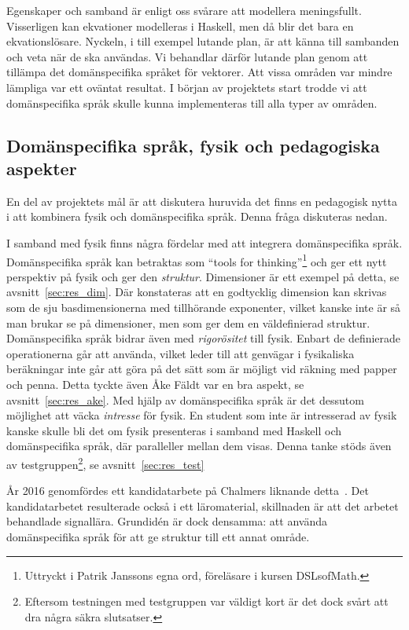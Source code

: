Egenskaper och samband är enligt oss svårare att modellera meningsfullt. Visserligen kan ekvationer modelleras i Haskell, men då blir det bara en ekvationslösare. Nyckeln, i till exempel lutande plan, är att känna till sambanden och veta när de ska användas. Vi behandlar därför lutande plan genom att tillämpa det domänspecifika språket för vektorer. Att vissa områden var mindre lämpliga var ett oväntat resultat. I början av projektets start trodde vi att domänspecifika språk skulle kunna implementeras till alla typer av områden.

\subsection{Domänspecifika språk, fysik och pedagogiska aspekter}\label{sec:bara_fysik}

En del av projektets mål är att diskutera huruvida det finns en pedagogisk nytta i att kombinera fysik och domänspecifika språk. Denna fråga diskuteras nedan.

I samband med fysik finns några fördelar med att integrera domänspecifika språk. Domänspecifika språk kan betraktas som ``tools for thinking''\footnote{Uttryckt i Patrik Janssons egna ord, föreläsare i kursen DSLsofMath.} och ger ett nytt perspektiv på fysik och ger den \textit{struktur}. Dimensioner är ett exempel på detta, se avsnitt~\ref{sec:res_dim}. Där konstateras att en godtycklig dimension kan skrivas som de sju basdimensionerna med tillhörande exponenter, vilket kanske inte är så man brukar se på dimensioner, men som ger dem en väldefinierad struktur. Domänspecifika språk bidrar även med \textit{rigorösitet} till fysik. Enbart de definierade operationerna går att använda, vilket leder till att genvägar i fysikaliska beräkningar inte går att göra på det sätt som är möjligt vid räkning med papper och penna. Detta tyckte även Åke Fäldt var en bra aspekt, se avsnitt~\ref{sec:res_ake}. Med hjälp av domänspecifika språk är det dessutom möjlighet att väcka \textit{intresse} för fysik. En student som inte är intresserad av fysik kanske skulle bli det om fysik presenteras i samband med Haskell och domänspecifika språk, där paralleller mellan dem visas. Denna tanke stöds även av testgruppen\footnote{Eftersom testningen med testgruppen var väldigt kort är det dock svårt att dra några säkra slutsatser.}, se avsnitt~\ref{sec:res_test}

År 2016 genomfördes ett kandidatarbete på Chalmers liknande
detta~\cite{kandidat2016}. Det kandidatarbetet resulterade också i ett
läromaterial, skillnaden är att det arbetet behandlade signallära. Grundidén är
dock densamma: att använda domänspecifika språk för att ge struktur till ett
annat område.

